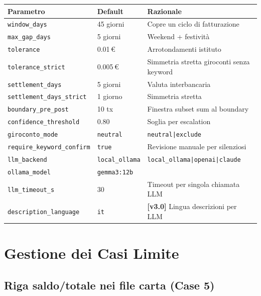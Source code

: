 \documentclass[11pt, a4paper]{article}
\begin{document}
\begin{center}
\begin{tabular}{@{}L{5.5cm} C{2.5cm} L{5.5cm}@{}}
\toprule
\textbf{Parametro} & \textbf{Default} & \textbf{Razionale} \\
\midrule
\texttt{window\_days}              & 45 giorni  & Copre un ciclo di fatturazione \\
\texttt{max\_gap\_days}            & 5 giorni   & Weekend + festività \\
\texttt{tolerance}                 & 0.01\,\euro & Arrotondamenti istituto \\
\texttt{tolerance\_strict}         & 0.005\,\euro & Simmetria stretta giroconti senza keyword \\
\texttt{settlement\_days}          & 5 giorni   & Valuta interbancaria \\
\texttt{settlement\_days\_strict}  & 1 giorno   & Simmetria stretta \\
\texttt{boundary\_pre\_post}       & 10 tx      & Finestra subset sum al boundary \\
\texttt{confidence\_threshold}     & 0.80       & Soglia per escalation \\
\texttt{giroconto\_mode}           & \texttt{neutral} & \texttt{neutral|exclude} \\
\texttt{require\_keyword\_confirm} & \texttt{true} & Revisione manuale per silenziosi \\
\texttt{llm\_backend}              & \texttt{local\_ollama} & \texttt{local\_ollama|openai|claude} \\
\texttt{ollama\_model}             & \texttt{gemma3:12b} & \\
\texttt{llm\_timeout\_s}           & 30         & Timeout per singola chiamata LLM \\
\texttt{description\_language}     & \texttt{it} & \textbf{[v3.0]} Lingua descrizioni per LLM \\
\bottomrule
\end{tabular}
\end{center}


\section{Gestione dei Casi Limite}

\subsection{Riga saldo/totale nei file carta (Case 5)}
\end{document}
